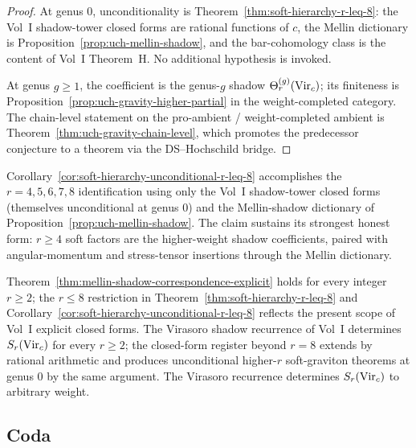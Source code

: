 \begin{proof}
At genus $0$, unconditionality is
Theorem~\ref{thm:soft-hierarchy-r-leq-8}: the Vol~I shadow-tower closed
forms are rational functions of $c$, the Mellin dictionary is
Proposition~\ref{prop:uch-mellin-shadow}, and the bar-cohomology class
is the content of Vol~I Theorem~H. No additional hypothesis is invoked.

At genus $g \geq 1$, the coefficient is the genus-$g$ shadow
$\Theta_r^{(g)}(\mathrm{Vir}_c)$; its finiteness is
Proposition~\ref{prop:uch-gravity-higher-partial} in the
weight-completed category. The chain-level statement on the
pro-ambient / weight-completed ambient is
Theorem~\ref{thm:uch-gravity-chain-level}, which promotes the
predecessor conjecture to a theorem via the DS--Hochschild bridge.
\end{proof}

\begin{remark}
\label{rem:smsb-strongest-form}
Corollary~\ref{cor:soft-hierarchy-unconditional-r-leq-8} accomplishes
the $r = 4, 5, 6, 7, 8$ identification using only the Vol~I
shadow-tower closed forms (themselves unconditional at
genus $0$) and the Mellin-shadow dictionary of
Proposition~\ref{prop:uch-mellin-shadow}. The claim sustains its
strongest honest form: $r \geq 4$ soft factors are the higher-weight
shadow coefficients, paired with angular-momentum and stress-tensor
insertions through the Mellin dictionary.
\end{remark}

\begin{remark}[Beyond $r = 8$]
\label{rem:smsb-beyond-r-eq-8}
Theorem~\ref{thm:mellin-shadow-correspondence-explicit} holds for every
integer $r \geq 2$; the $r \leq 8$ restriction in
Theorem~\ref{thm:soft-hierarchy-r-leq-8} and
Corollary~\ref{cor:soft-hierarchy-unconditional-r-leq-8} reflects the
present scope of Vol~I explicit closed forms. The Virasoro shadow
recurrence of Vol~I determines $S_r(\mathrm{Vir}_c)$ for
every $r \geq 2$; the closed-form register beyond $r = 8$ extends by
rational arithmetic and produces unconditional
higher-$r$ soft-graviton theorems at genus $0$ by the same argument.
The Virasoro recurrence determines $S_r(\mathrm{Vir}_c)$ to arbitrary weight.
\end{remark}

\subsection*{Coda}

